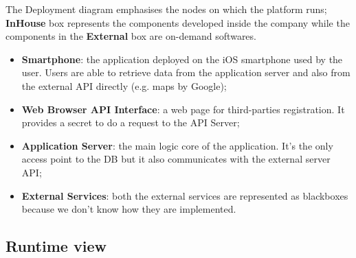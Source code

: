 \documentclass[DD.tex]{subfiles}
\begin{document}
The Deployment diagram emphasises the nodes on which the platform runs;\\
\textbf{InHouse} box represents the components developed inside the company while 
the components in the \textbf{External} box are on-demand softwares.\\
\begin{itemize}
\item	\textbf{Smartphone}: the application deployed on the iOS smartphone used by the user. Users are able to retrieve data from the application server and also from the external API directly (e.g. maps by Google);
\item \textbf{Web Browser API Interface}: a web page for third-parties registration. It provides a secret to do a request to the API Server;
\item \textbf{Application Server}: the  main logic core of the application. It’s the only access point to the DB but it also communicates with the external server API;
\item  \textbf{External Services}: both the external services are represented as  blackboxes because we don't know how they are implemented.
\end{itemize}
\newpage


\subsection{Runtime view}

	
	
\newpage
\end{document}
